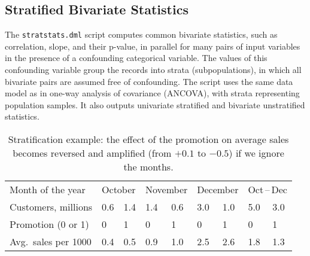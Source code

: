 \begin{comment}

 Licensed to the Apache Software Foundation (ASF) under one
 or more contributor license agreements.  See the NOTICE file
 distributed with this work for additional information
 regarding copyright ownership.  The ASF licenses this file
 to you under the Apache License, Version 2.0 (the
 "License"); you may not use this file except in compliance
 with the License.  You may obtain a copy of the License at

   http://www.apache.org/licenses/LICENSE-2.0

 Unless required by applicable law or agreed to in writing,
 software distributed under the License is distributed on an
 "AS IS" BASIS, WITHOUT WARRANTIES OR CONDITIONS OF ANY
 KIND, either express or implied.  See the License for the
 specific language governing permissions and limitations
 under the License.

\end{comment}

\subsection{Stratified Bivariate Statistics}

\smallskip

The {\tt stratstats.dml} script computes common bivariate statistics, such
as correlation, slope, and their p-value, in parallel for many pairs of input
variables in the presence of a confounding categorical variable.  The values
of this confounding variable group the records into strata (subpopulations),
in which all bivariate pairs are assumed free of confounding.  The script
uses the same data model as in one-way analysis of covariance (ANCOVA), with
strata representing population samples.  It also outputs univariate stratified
and bivariate unstratified statistics.

\begin{table}[t]\hfil
\begin{tabular}{|l|ll|ll|ll||ll|}
\hline
Month of the year & \multicolumn{2}{l|}{October} & \multicolumn{2}{l|}{November} &
    \multicolumn{2}{l||}{December} & \multicolumn{2}{c|}{Oct$\,$--$\,$Dec} \\
Customers, millions    & 0.6 & 1.4 & 1.4 & 0.6 & 3.0 & 1.0 & 5.0 & 3.0 \\
\hline
Promotion (0 or 1)     & 0   & 1   & 0   & 1   & 0   & 1   & 0   & 1   \\
Avg.\ sales per 1000   & 0.4 & 0.5 & 0.9 & 1.0 & 2.5 & 2.6 & 1.8 & 1.3 \\
\hline
\end{tabular}\hfil
\caption{Stratification example: the effect of the promotion on average sales
becomes reversed and amplified (from $+0.1$ to $-0.5$) if we ignore the months.}
\label{table:stratexample}
\end{table}

